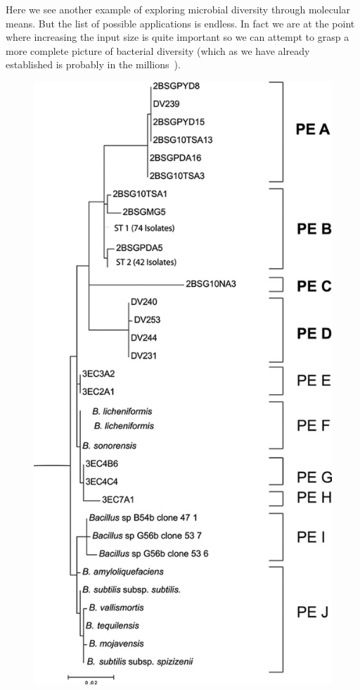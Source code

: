 Here we see another example of exploring microbial diversity through molecular means.
But the list of possible applications is endless.
In fact we are at the point where increasing the input size is quite important so we can attempt to grasp a more complete picture of bacterial diversity (which as we have already established is probably in the millions~\cite{cohan2008origins}).


\begin{figure}[h!]
\centering
\includegraphics[scale=0.45]{images/DeathValleyES-CH2}

\end{figure}
